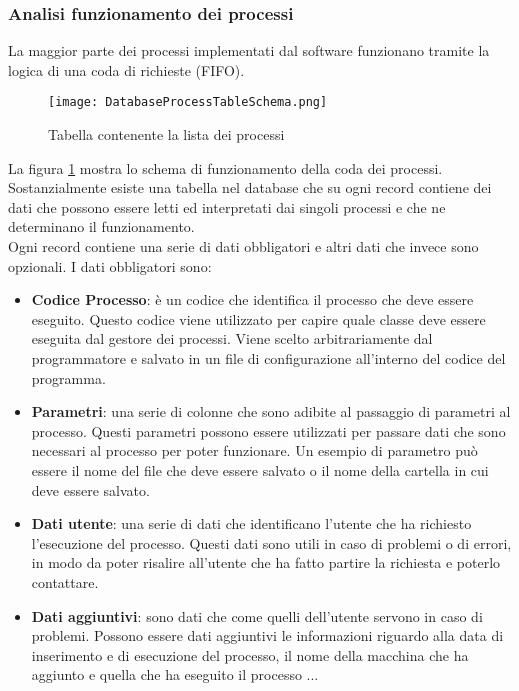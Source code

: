 \subsubsection{Analisi funzionamento dei processi}
La maggior parte dei processi implementati dal software funzionano tramite la
logica di una coda di richieste (FIFO).

\begin{figure}[H]
    \centering
    \texttt{[image: DatabaseProcessTableSchema.png]} 
    \caption{Tabella contenente la lista dei processi}
    \label{fig:table-process-list}
\end{figure}

La figura \ref{fig:table-process-list} mostra lo schema di funzionamento della 
coda dei processi. \\
Sostanzialmente esiste una tabella nel database che su ogni record contiene
dei dati che possono essere letti ed interpretati dai singoli processi e che 
ne determinano il funzionamento. \\ 
Ogni record contiene una serie di dati obbligatori e altri dati che invece 
sono opzionali. I dati obbligatori sono:
\begin{itemize}
    \item \textbf{Codice Processo}: è un codice che identifica il processo che
        deve essere eseguito. Questo codice viene utilizzato per capire quale
        classe deve essere eseguita dal gestore dei processi. Viene scelto 
        arbitrariamente dal programmatore e salvato in un file di 
        configurazione all'interno del codice del programma.
    \item \textbf{Parametri}: una serie di colonne che sono adibite al passaggio
        di parametri al processo. Questi parametri possono essere utilizzati 
        per passare dati che sono necessari al processo per poter funzionare.
        Un esempio di parametro può essere il nome del file che deve essere
        salvato o il nome della cartella in cui deve essere salvato.
    \item \textbf{Dati utente}: una serie di dati che identificano l'utente che
        ha richiesto l'esecuzione del processo. Questi dati sono utili
        in caso di problemi o di errori, in modo da poter risalire all'utente
        che ha fatto partire la richiesta e poterlo contattare.
    \item \textbf{Dati aggiuntivi}: sono dati che come quelli dell'utente
        servono in caso di problemi. Possono essere dati aggiuntivi le 
        informazioni riguardo alla data di inserimento e di esecuzione del 
        processo, il nome della macchina che ha aggiunto e quella che ha 
        eseguito il processo ...
\end{itemize}

